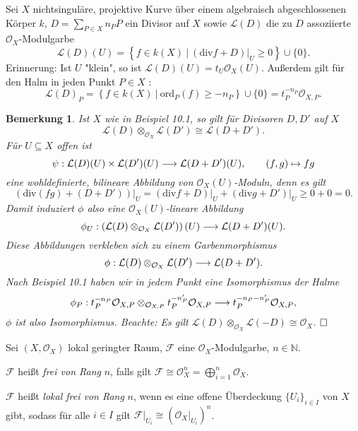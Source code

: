 \documentclass[11pt]{book}
\newtheorem{remark}[theorem]{Bemerkung}
\theoremstyle{nonumberbreak}
\newenvironment{defin}[1][]{\ifthenelse{\equal{#1}{}}{\definition}{\definition[#1]}\rm}{\enddefinition}
\newenvironment{pr}[1][]{\ifthenelse{\equal{#1}{}}{\proof}{\proof[#1]}\rm}{\endproof}
\newenvironment{ex}[1][]{\ifthenelse{\equal{#1}{}}{\example}{\example[#1]}\rm}{\endexample}
\begin{document}
\begin{spacing}{1.4}
\begin{ex} %
Sei $X$ nichtsinguläre, projektive Kurve über einem algebraisch abgeschlossenen Körper $k$, $D= \sum_{P \in X} n_P P$ ein Divisor auf $X$ sowie $\mathcal{L}(D)$ die zu $D$ assoziierte $\mathcal{O}_X$-Modulgarbe
$$\mathcal{L}(D)(U) = \left\{ f \in k(X) \ \vert \ \left( \text{div} f + D \right)\vert_U \geqslant 0 \right\} \cup \{0\}.$$
Erinnerung: Ist $U$ "klein", so ist $\mathcal{L}(D)(U) = t_U \mathcal{O}_X(U)$. Außerdem gilt für den Halm in jeden Punkt $P \in X$ :
$$\mathcal{L}(D)_P = \left\{ f \in k(X) \ \vert \ \text{ord}_P(f) \geqslant -n_P \right\} \cup \{0\} = t_P^{-n_P} \mathcal{O}_{X,P}.$$
\end{ex}





\begin{remark}
Ist $X$ wie in Beispiel 10.1, so gilt für Divisoren $D,D'$ auf $X$
$$\mathcal{L}(D) \otimes_{\mathcal{O}_X} \mathcal{L}(D') \cong \mathcal{L}(D+D').$$
\begin{pr}
Für $U \subseteq X$ offen ist 
$$\psi: \mathcal{L}(D)(U) \times \mathcal{L}(D')(U) \longrightarrow \mathcal{L}(D+D')(U), \qquad (f,g) \mapsto fg$$
eine wohldefinierte, bilineare Abbildung von $\mathcal{O}_X(U)$-Moduln, denn es gilt 
$$\left( \text{div} (fg) + (D+D') \right) \vert_U = \left( \text{div} f + D \right) \vert_U + \left( \text{div} g + D' \right) \vert_U \geqslant 0 + 0 = 0.$$
Damit induziert $\phi$ also eine $\mathcal{O}_X(U)$-lineare Abbildung
$$\phi_U: \left(\mathcal{L}(D) \otimes_{\mathcal{O}_X} \mathcal{L}(D') \right)(U) \longrightarrow \mathcal{L}(D+D')(U).$$
Diese Abbildungen verkleben sich zu einem Garbenmorphismus 
$$\phi:\mathcal{L}(D) \otimes_{\mathcal{O}_X} \mathcal{L}(D') \longrightarrow \mathcal{L}(D+D').$$
Nach Beispiel 10.1 haben wir in jedem Punkt eine Isomorphismus der Halme
$$\phi_P: t_P^{-n_P} \mathcal{O}_{X,P} \otimes_{\mathcal{O}_{X,P}} t_P^{-n_P'} \mathcal{O}_{X,P} \longrightarrow t_P^{-n_P-n_P'} \mathcal{O}_{X,P},$$
$\phi$ ist also Isomorphismus. Beachte: Es gilt $\mathcal{L}(D) \otimes_{\mathcal{O}_X} \mathcal{L}(-D) \cong \mathcal{O}_X$. $\hfill \Box$
\end{pr}
\end{remark}


\newcommand{\lokring}{(X, \mathcal{O}_X)}
\newcommand{\oxg}{\mathcal{O}_X}


\begin{defin}   %
Sei $\lokring$ lokal geringter Raum, $\mathcal{F}$ eine $\oxg$-Modulgarbe, $n \in \mathbb{N}$.
\begin{compactenum}
\item $\mathcal{F}$ heißt \textit{frei von Rang} $n$, falls gilt $\mathcal{F} \cong \oxg^n = \bigoplus_{i=1}^n \oxg$.
\item $\mathcal{F}$ heißt \textit{lokal frei von Rang} $n$, wenn es eine offene Überdeckung $\{U_i\}_{i\in I}$ von $X$ gibt, sodass für alle $i \in I$ gilt $\mathcal{F}\vert_{U_i} \cong \left( \oxg\vert_{U_i}\right)^n$.
\end{compactenum}


\end{defin}
\end{spacing}
\end{document}
